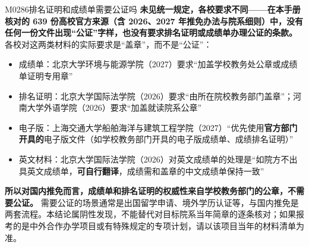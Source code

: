 \begin{qa}{M0286}{排名证明和成绩单需要公证吗}
\textbf{未见统一规定，各校要求不同——在本手册核对的 639 份高校官方来源（含 2026、2027 年推免办法与院系细则）中，没有任何一份文件出现“公证”字样，也没有要求排名证明或成绩单办理公证的条款。} 各校对这两类材料的实际要求是“盖章”，而不是“公证”：

\begin{itemize}
  \item 成绩单：北京大学环境与能源学院（2027）要求“加盖学校教务处公章或成绩单证明专用章”
  \item 排名证明：北京大学国际法学院（2026）要求“由所在院校教务部门盖章”；河南大学外语学院（2026）要求“加盖就读院系公章”
  \item 电子版：上海交通大学船舶海洋与建筑工程学院（2027）“优先使用\textbf{官方部门开具的}电子版文件（如学校教务部门开具的电子版成绩单、成绩排名证明）”
  \item 英文材料：北京大学国际法学院（2026）对英文成绩单的处理是“如院方不出具英文成绩单，\textbf{可自行翻译}，成绩需和盖章的中文成绩单保持一致”
\end{itemize}

\textbf{所以对国内推免而言，成绩单和排名证明的权威性来自学校教务部门的公章，不需要公证。} 需要公证的场景通常是出国留学申请、境外学历认证等，与国内推免是两套流程。本结论属阴性发现，不能替代对目标院系当年简章的逐条核对；如果报考的是中外合作办学项目或有特殊规定的专项计划，请以该项目当年的材料清单为准。
\end{qa}

